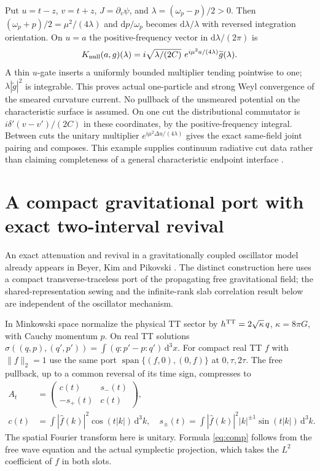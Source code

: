 \documentclass[11pt]{article}
\newcommand{\dd}{\mathrm d}
\begin{document}
Put \(u=t-z\), \(v=t+z\), \(J=\partial_v\psi\), and \(\lambda=(\omega_p-p)/2>0\). Then \((\omega_p+p)/2=\mu^2/(4\lambda)\) and \(\dd p/\omega_p\) becomes \(\dd\lambda/\lambda\) with reversed integration orientation. On \(u=a\) the positive-frequency vector in \(\dd\lambda/(2\pi)\) is
\[
 K_{\rm null}(a,g)(\lambda)=
       i\sqrt{\lambda/(2C)}\ e^{i\mu^2 a/(4\lambda)}\widetilde g(\lambda).
\]
A thin \(u\)-gate inserts a uniformly bounded multiplier tending pointwise to one; \(\lambda|\widetilde g|^2\) is integrable. This proves actual one-particle and strong Weyl convergence of the smeared curvature current. No pullback of the unsmeared potential on the characteristic surface is assumed. On one cut the distributional commutator is \(i\delta'(v-v')/(2C)\) in these coordinates, by the positive-frequency integral. Between cuts the unitary multiplier \(e^{i\mu^2\Delta u/(4\lambda)}\) gives the exact same-field joint pairing and composes. This example supplies continuum radiative cut data rather than claiming completeness of a general characteristic endpoint interface \cite{characteristic}.

\section{A compact gravitational port with exact two-interval revival}

An exact attenuation and revival in a gravitationally coupled oscillator model already appears in Beyer, Kim and Pikovski \cite{bkp}. The distinct construction here uses a compact transverse-traceless port of the propagating free gravitational field; the shared-representation sewing and the infinite-rank slab correlation result below are independent of the oscillator mechanism.

In Minkowski space normalize the physical TT sector by \(h^{\rm TT}=2\sqrt\kappa\,q\), \(\kappa=8\pi G\), with Cauchy momentum \(p\). On real TT solutions \(\sigma((q,p),(q',p'))=\int(q:p'-p:q')\,\dd^3x\). For compact real TT \(f\) with \(\|f\|_2=1\) use the same port
\(\operatorname{span}\{(f,0),(0,f)\}\) at \(0,\tau,2\tau\). The free pullback, up to a common reversal of its time sign, compresses to
\begin{align}
 A_t&=\begin{pmatrix}c(t)&s_-(t)\\-s_+(t)&c(t)\end{pmatrix},\label{eq:comp}\\
 c(t)&=\int|\widehat f(k)|^2\cos(t|k|)\,\dd^3k,\quad
 s_\pm(t)=\int|\widehat f(k)|^2 |k|^{\pm 1}\sin(t|k|)\,\dd^3k.\nonumber
\end{align}
The spatial Fourier transform here is unitary. Formula \eqref{eq:comp} follows from the free wave equation and the actual symplectic projection, which takes the \(L^2\) coefficient of \(f\) in both slots.
\end{document}
